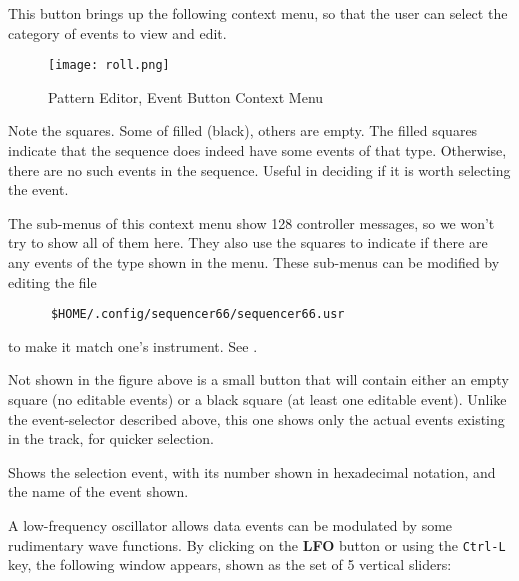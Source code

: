    \setcounter{ItemCounter}{0}      %

   This button brings up the following context menu, so that the user can
   select the category of events to view and edit.

\begin{figure}[H]
   \centering 
   \texttt{[image: roll.png]}
   \caption{Pattern Editor, Event Button Context Menu}
   \label{fig:pattern_editor_bottom_event_context_menu}
\end{figure}

   Note the squares.  Some of filled (black), others are empty.  The filled
   squares indicate that the sequence does indeed have some events of that
   type.  Otherwise, there are no such events in the sequence.
   Useful in deciding if it is worth selecting the event.

   The sub-menus of this context menu show 128 controller messages,
   so we won't try to show all of them here.  They also use the squares to
   indicate if there are any events of the type shown in the menu.
   These sub-menus can be modified by editing the file
   
   \begin{verbatim}
      $HOME/.config/sequencer66/sequencer66.usr
   \end{verbatim}

   to make it match one's instrument.  See .

   Not shown in the figure above is a small button that will contain either
   an empty square (no editable events) or a black square (at least one
   editable event).  Unlike the event-selector described above, this one
   shows only the actual events existing in the track, for quicker selection.

   Shows the selection event, with its number shown in hexadecimal notation,
   and the name of the event shown.

   A low-frequency oscillator allows data events
   can be modulated by some rudimentary wave functions.
   By clicking on the \textbf{LFO} button or using the \texttt{Ctrl-L} key,
   the following window appears, shown as the set of 5 vertical sliders:

